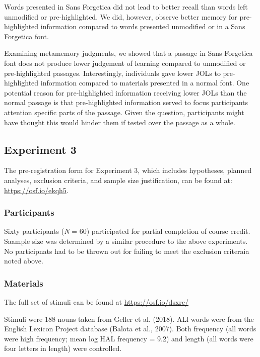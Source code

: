 \documentclass[english,pdf]{apa6}
\begin{document}
Words presented in Sans Forgetica did not lead to better recall than words left unmodified or pre-highlighted. We did, however, observe better memory for pre-highlighted information compared to words presented unmodified or in a Sans Forgetica font.

Examining metamemory judgments, we showed that a passage in Sans Forgetica font does not produce lower judgement of learning compared to unmodified or pre-highlighted passages. Interestingly, individuals gave lower JOLs to pre-highlighted information compared to materials presented in a normal font. One potential reason for pre-highlighted information receiving lower JOLs than the normal passage is that pre-highlighted information served to focus participants attention specific parts of the passage. Given the question, participants might have thought this would hinder them if tested over the passage as a whole.

\hypertarget{experiment-3}{%
\subsection{Experiment 3}\label{experiment-3}}

The pre-registration form for Experiment 3, which includes hypotheses, planned analyses, exclusion criteria, and sample size justification, can be found at: \url{https://osf.io/ekqh5}.

\hypertarget{participants-2}{%
\subsubsection{Participants}\label{participants-2}}

Sixty participants (\emph{N} = 60) participated for partial completion of course credit. Saample size was determined by a similar procedure to the above experiments. No participnats had to be thrown out for failing to meet the exclusion criteraia noted above.

\hypertarget{materials-2}{%
\subsubsection{Materials}\label{materials-2}}

The full set of stimuli can be found at \url{https://osf.io/dsxrc/}

Stimuli were 188 nouns taken from Geller et al. (2018). ALl words were from the English Lexicon Project database (Balota et al., 2007). Both frequency (all words were high frequency; mean log HAL frequency = 9.2) and length (all words were four letters in length) were controlled.
\end{document}

